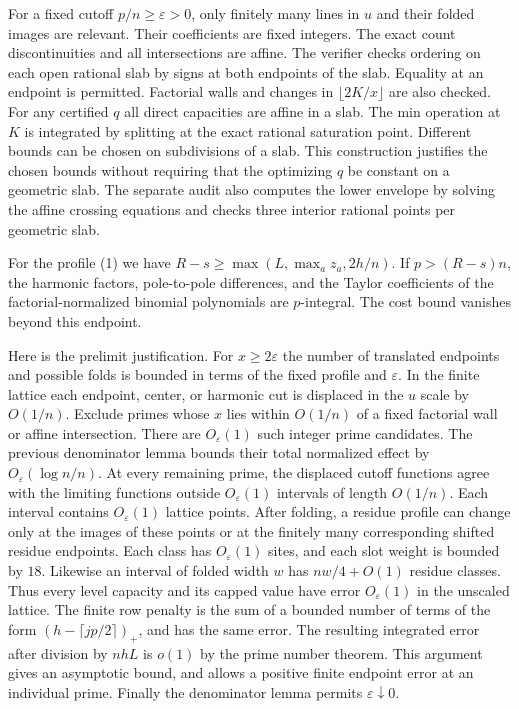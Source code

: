 \IfFileExists{TS1cmr.fd}{\documentclass[11pt]{article}}
\begin{document}
For a fixed cutoff \(p/n\ge\varepsilon>0\), only finitely
many lines in \(u\) and their folded images are relevant.
Their coefficients are fixed integers. The exact count
discontinuities and all intersections are affine.
The verifier checks ordering on each open rational slab by
signs at both endpoints of the slab. Equality at an endpoint
is permitted. Factorial walls and changes in \(\lfloor2K/x\rfloor\)
are also checked. For any certified \(q\) all direct
capacities are affine in a slab. The min operation at \(K\)
is integrated by splitting at the exact rational saturation
point. Different bounds can be chosen on subdivisions of a
slab. This construction justifies the chosen bounds without
requiring that the optimizing \(q\) be constant on a geometric
slab. The separate audit also computes the lower envelope by
solving the affine crossing equations and checks three interior
rational points per geometric slab.

For the profile (1) we have
\(R-s\ge\max(L,\max_a z_a,2h/n)\). If \(p>(R-s)n\),
the harmonic factors, pole-to-pole differences, and the Taylor
coefficients of the factorial-normalized binomial polynomials
are \(p\)-integral. The cost bound vanishes beyond this endpoint.

Here is the prelimit justification. For \(x\ge 2\varepsilon\)
the number of translated endpoints and possible folds is
bounded in terms of the fixed profile and \(\varepsilon\).
In the finite lattice each endpoint, center, or harmonic cut
is displaced in the \(u\) scale by \(O(1/n)\). Exclude primes
whose \(x\) lies within \(O(1/n)\) of a fixed factorial wall
or affine intersection. There are \(O_\varepsilon(1)\) such
integer prime candidates. The previous denominator lemma bounds
their total normalized effect by \(O_\varepsilon(\log n/n)\).
At every remaining prime, the displaced cutoff functions agree
with the limiting functions outside \(O_\varepsilon(1)\)
intervals of length \(O(1/n)\). Each interval contains
\(O_\varepsilon(1)\) lattice points. After folding, a residue
profile can change only at the images of these points or at the
finitely many corresponding shifted residue endpoints. Each
class has \(O_\varepsilon(1)\) sites, and each slot weight is
bounded by \(18\). Likewise an interval of folded width \(w\)
has \(nw/4+O(1)\) residue classes. Thus every level capacity
and its capped value have error \(O_\varepsilon(1)\) in the
unscaled lattice. The finite row penalty is the sum of a
bounded number of terms of the form
\((h-\lceil jp/2\rceil)_+\), and has the same error.
The resulting integrated error after division by \(nhL\)
is \(o(1)\) by the prime number theorem.
This argument gives an asymptotic bound, and allows a positive
finite endpoint error at an individual prime.
Finally the denominator lemma permits \(\varepsilon\downarrow0\).
\end{document}
